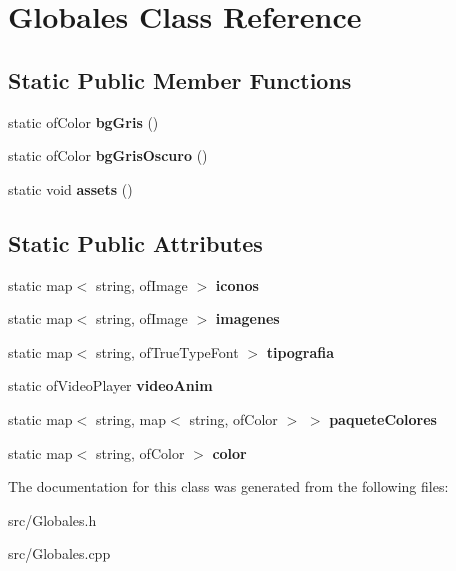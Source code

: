 \hypertarget{class_globales}{}\section{Globales Class Reference}
\label{class_globales}
\subsection*{Static Public Member Functions}
\begin{DoxyCompactItemize}
\item 
\hypertarget{class_globales_a72e0f0217e8ab9d827177c2175da8002}{}static of\+Color {\bfseries bg\+Gris} ()\label{class_globales_a72e0f0217e8ab9d827177c2175da8002}

\item 
\hypertarget{class_globales_a40c6371017fa4b1a9595fabf7c7acbb6}{}static of\+Color {\bfseries bg\+Gris\+Oscuro} ()\label{class_globales_a40c6371017fa4b1a9595fabf7c7acbb6}

\item 
\hypertarget{class_globales_ad74a0eba37b5082469916f3fd70a895c}{}static void {\bfseries assets} ()\label{class_globales_ad74a0eba37b5082469916f3fd70a895c}

\end{DoxyCompactItemize}
\subsection*{Static Public Attributes}
\begin{DoxyCompactItemize}
\item 
\hypertarget{class_globales_a63c8d66616fa8bf4dba001c97624a777}{}static map$<$ string, of\+Image $>$ {\bfseries iconos}\label{class_globales_a63c8d66616fa8bf4dba001c97624a777}

\item 
\hypertarget{class_globales_ac87a3636b3fc72658602e6c0121c1c58}{}static map$<$ string, of\+Image $>$ {\bfseries imagenes}\label{class_globales_ac87a3636b3fc72658602e6c0121c1c58}

\item 
\hypertarget{class_globales_ab9fed6dfe700d096d9bdbc3739ba6422}{}static map$<$ string, of\+True\+Type\+Font $>$ {\bfseries tipografia}\label{class_globales_ab9fed6dfe700d096d9bdbc3739ba6422}

\item 
\hypertarget{class_globales_ad75cf1d4912793c12bbf3f1cd62561a9}{}static of\+Video\+Player {\bfseries video\+Anim}\label{class_globales_ad75cf1d4912793c12bbf3f1cd62561a9}

\item 
\hypertarget{class_globales_aa739970d9ff787730b65849cfd2f2a13}{}static map$<$ string, map$<$ string, of\+Color $>$ $>$ {\bfseries paquete\+Colores}\label{class_globales_aa739970d9ff787730b65849cfd2f2a13}

\item 
\hypertarget{class_globales_ac562b29608f8872c0d6d6813c2daec49}{}static map$<$ string, of\+Color $>$ {\bfseries color}\label{class_globales_ac562b29608f8872c0d6d6813c2daec49}

\end{DoxyCompactItemize}


The documentation for this class was generated from the following files\+:\begin{DoxyCompactItemize}
\item 
src/Globales.\+h\item 
src/Globales.\+cpp\end{DoxyCompactItemize}
